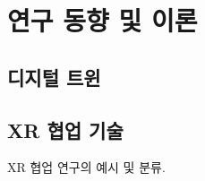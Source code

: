 
\section{연구 동향 및 이론}
\subsection{디지털 트윈}

\subsection{XR 협업 기술}

\begin{sidewaystable}
\renewcommand{\arraystretch}{1.4}
\centering
\caption{XR 협업 연구의 예시 및 분류\cite{Lee2021XR}.}
\label{table:xr_coop_papers_table}


\end{sidewaystable}
